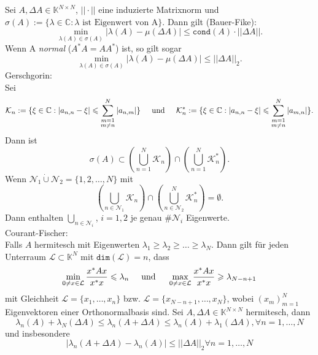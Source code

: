 \documentclass{report}
\begin{document}
 {
  Sei $A, \Delta A  \in \mathbb{K}^{N\times N}$, 
  $||\cdot||$ eine induzierte Matrixnorm und
  $\sigma(A) := \{\lambda \in \mathbb{C} : 
  \lambda \text{ ist Eigenwert von A} \}$.
  Dann gilt (Bauer-Fike):
  \[
    \min_{\lambda(A) \in \sigma(A)}|\lambda(A) - \mu(\Delta A)|
    \leq \texttt{cond}(A) \cdot ||\Delta A||.
  \]
  Wenn A \textit{normal} ($A^*A = AA^*$)  ist, so gilt sogar
  \[
    \min_{\lambda(A) \in \sigma(A)}|\lambda(A) - \mu(\Delta A)|
    \leq  ||\Delta A||_2.
  \]
  Gerschgorin:\\
  Sei
  \[
    \mathcal{K}_n := \{\xi \in \mathbb{C}: 
      |a_{n,n} - \xi|
      \leq 
      \sum_{\substack{m=1 \\ m\neq n}}^{N} |a_{n,m}|
    \}
    \hspace{0.5cm} \text{und} \hspace{0.5cm}
    \mathcal{K}^{*}_n := \{\xi \in \mathbb{C}: 
      |a_{n,n} - \xi|
      \leq 
      \sum_{\substack{m=1 \\ m\neq n}}^{N} |a_{m,n}|
    \}.
  \]
  Dann ist 
  \[
    \sigma(A) \subset \left(\bigcup_{n=1}^N \mathcal{K}_n
      \right) \cap  \left(\bigcup_{n=1}^N \mathcal{K}_n^*
      \right).
  \]
  Wenn $\mathcal{N}_1 \dot\cup \mathcal{N}_2 =  \{1,2, \dots,N\}$
  mit 
  \[
    \left(\bigcup_{n\in \mathcal{N}_1} \mathcal{K}_n
      \right) \cap  \left(\bigcup_{n \in \mathcal{N}_2}^N 
        \mathcal{K}_n^*
      \right) = \emptyset.
  \]
  Dann enthalten $\bigcup_{n \in \mathcal{N}_i}$, $i= 1,2$
  je genau $\#\mathcal{N}_i$ Eigenwerte.\\
  Courant-Fischer:\\
  Falls $A$ hermitesch mit Eigenwerten $\lambda_1 \geq 
  \lambda_2 \geq \dots \geq \lambda_N$. Dann gilt 
  für jeden Unterraum $\mathcal{L} \subset \mathbb{K}^N$
  mit $\texttt{dim}(\mathcal{L}) = n$, dass
  \[
    \min_{0\neq x \in \mathcal{L}} \frac{x^*Ax}{x^*x} \leq \lambda_n
    \hspace{0.5cm} \text{und} \hspace{0.5cm}
    \max_{0\neq x \in \mathcal{L}} \frac{x^*Ax}{x^*x} \geq \lambda_{N-n+1}
  \]
  mit Gleichheit $\mathcal{L}= \{x_1, \dots, x_n\}$ bzw. 
  $\mathcal{L}= \{x_{N-n+1}, \dots, x_N\}$, wobei 
  $(x_m)_{m=1}^{N}$ Eigenvektoren einer Orthonormalbasis sind.
}
 {
  Sei $A, \Delta A  \in \mathbb{K}^{N\times N}$ 
  hermitesch, dann
  \[
    \lambda_n(A) + \lambda_N(\Delta A) 
    \leq \lambda_n(A + \Delta A) \leq 
    \lambda_n(A) + \lambda_1(\Delta A), \forall 
    n=1,\dots,N
  \]
  und insbesondere
  \[
    |\lambda_n(A+\Delta A) - \lambda_n(A)| 
    \leq ||\Delta A||_2 \forall 
    n=1,\dots,N
  \]
}
\end{document}
